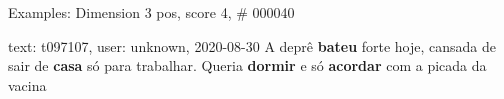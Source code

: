 \begin{frame}{Examples: Dimension 3 pos, score 4, \# 000040}
\footnotesize
\begin{exampleblock}{text: t097107, user: unknown, 2020-08-30}
A deprê \textbf{bateu} forte hoje, cansada de sair de \textbf{casa} só para 
trabalhar. Queria \textbf{dormir} e só \textbf{acordar} com a picada da vacina 
\end{exampleblock}
\end{frame}
